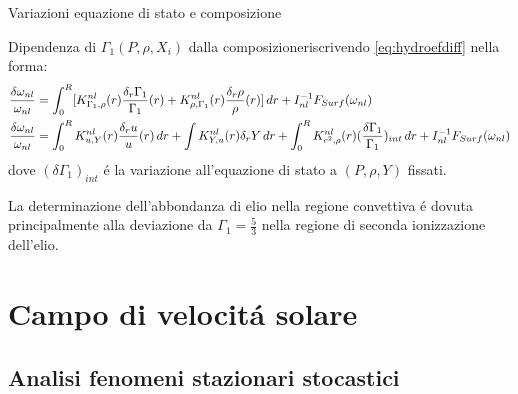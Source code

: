 \begin{frame}{Variazioni equazione di stato e composizione}

Dipendenza di $\Gamma_1(P,\rho,X_i)$ dalla composizioneriscrivendo \eqref{eq:hydroefdiff} nella forma:
\begin{align}
&\frac{\delta\omega_{nl}}{\omega_{nl}}=\int_0^R[K^{nl}_{\Gamma_1,\rho}(r)\frac{\delta_r\Gamma_1}{\Gamma_1}(r)+K^{nl}_{\rho,\Gamma_1}(r)\frac{\delta_r\rho}{\rho}(r)]\,dr+I_{nl}^{-1}F_{Surf}(\omega_{nl})\label{eq:invdGammadrho}\\
&\frac{\delta\omega_{nl}}{\omega_{nl}}=\int_0^RK^{nl}_{u,Y}(r)\frac{\delta_ru}{u}(r)\,dr+\int K^{nl}_{Y,u}(r)\delta_rY\,dr+\int_0^RK^{nl}_{c^2,\rho}(r)(\frac{\delta\Gamma_1}{\Gamma_1})_{int}\,dr+I_{nl}^{-1}F_{Surf}(\omega_{nl})\label{eq:diffthermo}
\end{align}
dove $(\delta\Gamma_1)_{int}$ \'e la variazione all'equazione di stato a $(P,\rho,Y)$ fissati.

La determinazione dell'abbondanza di elio nella regione convettiva \'e dovuta principalmente alla deviazione da $\Gamma_1=\frac{5}{3}$ nella regione di seconda ionizzazione dell'elio.

\end{frame}


\section{Campo di velocit\'a solare}

\subsection{Analisi fenomeni stazionari stocastici}

